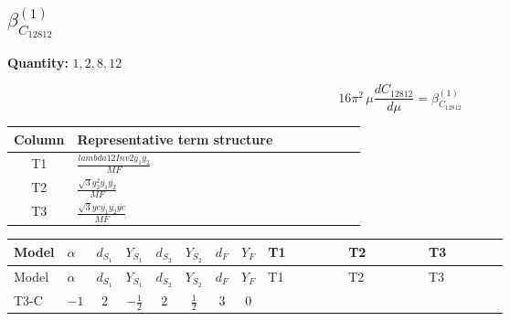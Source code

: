 \documentclass[8pt]{article}
\begin{document}
\begin{landscape}
\section*{$\beta_{C_{12812}}^{(1)}$}
\noindent\textbf{Quantity: }$\mathrm{1,2,8,12}$\par\smallskip
\[16\pi^2\,\mu\frac{d C_{12812}}{d\mu}=\beta_{C_{12812}}^{(1)}\]
\begin{center}
\begin{tabular}{@{}c >{\raggedright\arraybackslash}p{0.82\linewidth}@{}}
\toprule
Column & Representative term structure \\
\midrule
T1 & \(\displaystyle \frac{lambda12Inv2 \overline{y_{1}} \overline{y_{2}}}{MF}\) \\
\midrule
T2 & \(\displaystyle \frac{\sqrt{3} g_{2}^{2} \overline{y_{1}} \overline{y_{2}}}{MF}\) \\
\midrule
T3 & \(\displaystyle \frac{\sqrt{3} ye \overline{y_{1}} \overline{y_{2}} \overline{ye}}{MF}\) \\
\midrule
\bottomrule
\end{tabular}
\end{center}
\smallskip
\tiny
\begin{longtable}{@{}llcccccc >{\raggedright\arraybackslash}p{0.21\linewidth} >{\raggedright\arraybackslash}p{0.21\linewidth} >{\raggedright\arraybackslash}p{0.21\linewidth}@{}}
\toprule
Model & $\alpha$ & $d_{S_1}$ & $Y_{S_1}$ & $d_{S_2}$ & $Y_{S_2}$ & $d_F$ & $Y_F$ & T1 & T2 & T3 \\
\midrule
\endfirsthead
\toprule
Model & $\alpha$ & $d_{S_1}$ & $Y_{S_1}$ & $d_{S_2}$ & $Y_{S_2}$ & $d_F$ & $Y_F$ & T1 & T2 & T3 \\
\midrule
\endhead
T3-C & $-1$ & $2$ & $-\frac{1}{2}$ & $2$ & $\frac{1}{2}$ & $3$ & $0$ & \scriptsize\adjustbox{max width=\linewidth}{$\begin{gathered} \frac{lambda12Inv2 \overline{y_{1}} \overline{y_{2}}}{6 MF}\end{gathered}$} & \scriptsize\adjustbox{max width=\linewidth}{$\begin{gathered} \frac{\sqrt{3} g_{2}^{2} \overline{y_{1}} \overline{y_{2}}}{8 MF}\end{gathered}$} & \scriptsize\adjustbox{max width=\linewidth}{$\begin{gathered} - \frac{\sqrt{3} ye \overline{y_{1}} \overline{y_{2}} \overline{ye}}{24 MF}\end{gathered}$} \\
\midrule
\bottomrule
\end{longtable}
\clearpage

\end{landscape}
\end{document}
